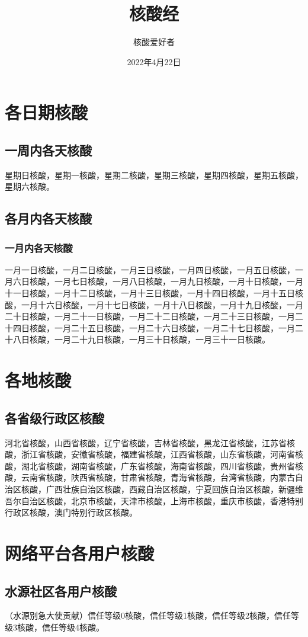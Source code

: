 \documentclass{ctexbook}
\title{核酸经}
\author{核酸爱好者}
\date{2022年4月22日}
\begin{document}
\maketitle

\tableofcontents

\chapter{各日期核酸}

\section{一周内各天核酸}
星期日核酸，星期一核酸，星期二核酸，星期三核酸，星期四核酸，星期五核酸，星期六核酸。

\section{各月内各天核酸}

\subsection{一月内各天核酸}
一月一日核酸，一月二日核酸，一月三日核酸，一月四日核酸，一月五日核酸，一月六日核酸，一月七日核酸，一月八日核酸，一月九日核酸，一月十日核酸，一月十一日核酸，一月十二日核酸，一月十三日核酸，一月十四日核酸，一月十五日核酸，一月十六日核酸，一月十七日核酸，一月十八日核酸，一月十九日核酸，一月二十日核酸，一月二十一日核酸，一月二十二日核酸，一月二十三日核酸，一月二十四日核酸，一月二十五日核酸，一月二十六日核酸，一月二十七日核酸，一月二十八日核酸，一月二十九日核酸，一月三十日核酸，一月三十一日核酸。

\chapter{各地核酸}

\section{各省级行政区核酸}
河北省核酸，山西省核酸，辽宁省核酸，吉林省核酸，黑龙江省核酸，江苏省核酸，浙江省核酸，安徽省核酸，福建省核酸，江西省核酸，山东省核酸，河南省核酸，湖北省核酸，湖南省核酸，广东省核酸，海南省核酸，四川省核酸，贵州省核酸，云南省核酸，陕西省核酸，甘肃省核酸，青海省核酸，台湾省核酸，内蒙古自治区核酸，广西壮族自治区核酸，西藏自治区核酸，宁夏回族自治区核酸，新疆维吾尔自治区核酸，北京市核酸，天津市核酸，上海市核酸，重庆市核酸，香港特别行政区核酸，澳门特别行政区核酸。

\chapter{网络平台各用户核酸}

\section{水源社区各用户核酸}
（水源别急大使贡献）信任等级0核酸，信任等级1核酸，信任等级2核酸，信任等级3核酸，信任等级4核酸。
\end{document}
